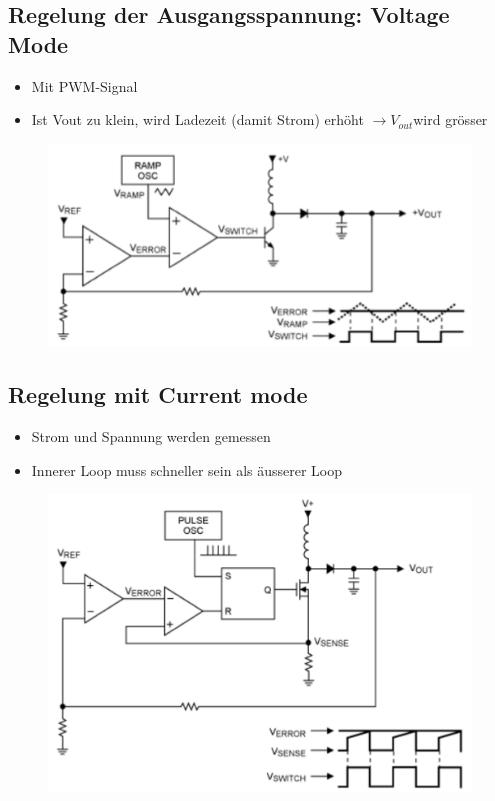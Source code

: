 \subsection{Regelung der Ausgangsspannung: Voltage Mode}
\begin{itemize}
  \item Mit PWM-Signal
  \item Ist Vout zu klein, wird Ladezeit (damit Strom) erhöht $\to V_{out}$wird
  grösser
\end{itemize}
\begin{figure}[htbs]
\includegraphics[scale=0.5]{pictures/ausgangsspannungsregelung}
\end{figure}

\subsection{Regelung mit Current mode}
\begin{itemize}
  \item Strom und Spannung werden gemessen
  \item Innerer Loop muss schneller sein als äusserer Loop
\end{itemize}
\begin{figure}[htbs]
\includegraphics[scale=0.5]{pictures/currentmode}
\end{figure}

